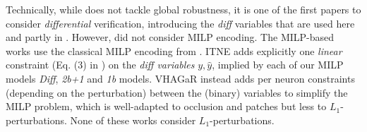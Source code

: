 Technically, while \cite{diff} does not tackle global robustness, it is one of the first papers to consider {\em differential} verification, introducing the {\em diff} variables that are used here and partly in \cite{ITNE}. 
However, \citet{diff} did not consider MILP encoding.
The MILP-based works \citep{vhagar,lipshitz,ITNE} 
use the classical MILP encoding from \cite{MILP}.
ITNE \citep{ITNE} adds explicitly one {\em linear} constraint (Eq. (3) in \cite{ITNE}) on the {\em diff variables} $y,\hat{y}$,
implied by each of our MILP models {\em Diff}, {\em 2b+1} and {\em 1b} models. VHAGaR \citep{vhagar} instead adds per neuron constraints (depending on the perturbation) between the (binary) variables to simplify the MILP problem, which is well-adapted to occlusion and patches but less to $L_1$-perturbations.
None of these works consider $L_1$-perturbations.




